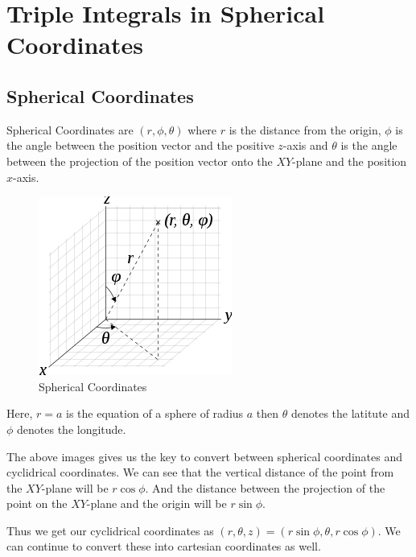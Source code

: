

\chapter{Triple Integrals in Spherical Coordinates} 

\bigbreak

\section{Spherical Coordinates}

Spherical Coordinates are $(r, \phi, \theta)$ where $r$ is the distance from the origin, 
$\phi$ is the angle between the position vector and the positive $z$-axis 
and $\theta$ is the angle between the projection of the position vector onto the $XY$-plane and the position $x$-axis.


\begin{figure}[ht!]
    \centering
    \includegraphics[scale=0.7]{./images/lecture_22_figure_1.png}
    \caption{Spherical Coordinates}
\end{figure}


Here, $r = a$ is the equation of a sphere of radius $a$ then $\theta$ denotes the latitute and $\phi$ denotes the longitude.


The above images gives us the key to convert between spherical coordinates and cyclidrical coordinates.
We can see that the vertical distance of the point from the $XY$-plane will be $r \cos \phi$.
And the distance between the projection of the point on the $XY$-plane and the origin will be $r \sin \phi$.

Thus we get our cyclidrical coordinates as $(r, \theta, z) = (r \sin \phi, \theta, r \cos \phi)$. 
We can continue to convert these into cartesian coordinates as well.


